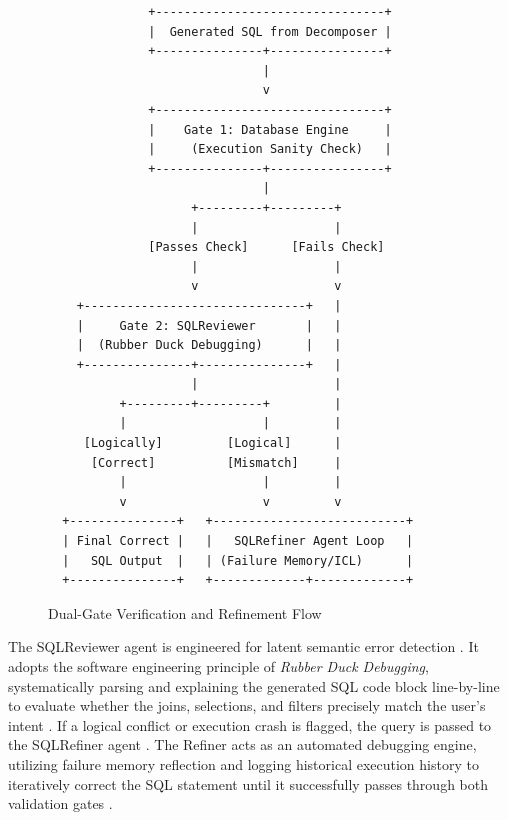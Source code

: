\begin{figure}[ht]
\centering
\begin{verbatim}
              +--------------------------------+
              |  Generated SQL from Decomposer |
              +---------------+----------------+
                              |
                              v
              +--------------------------------+
              |    Gate 1: Database Engine     |
              |     (Execution Sanity Check)   |
              +---------------+----------------+
                              |
                    +---------+---------+
                    |                   |
              [Passes Check]      [Fails Check]
                    |                   |
                    v                   v
    +-------------------------------+   |
    |     Gate 2: SQLReviewer       |   |
    |  (Rubber Duck Debugging)      |   |
    +---------------+---------------+   |
                    |                   |
          +---------+---------+         |
          |                   |         |
     [Logically]         [Logical]      |
      [Correct]          [Mismatch]     |
          |                   |         |
          v                   v         v
  +---------------+   +---------------------------+
  | Final Correct |   |   SQLRefiner Agent Loop   |
  |   SQL Output  |   | (Failure Memory/ICL)      |
  +---------------+   +-------------+-------------+
\end{verbatim}
\caption{Dual-Gate Verification and Refinement Flow}
\end{figure}

The SQLReviewer agent is engineered for latent semantic error detection \cite{SQLFixAgent_Towards_Semantic_Accurate_Text_to_SQL}. It adopts the
software engineering principle of \textit{Rubber Duck Debugging}, systematically parsing and explaining the generated
SQL code block line-by-line to evaluate whether the joins, selections, and filters precisely match the user's intent
\cite{SQLFixAgent_Towards_Semantic_Accurate_Text_to_SQL}. If a logical conflict or execution crash is flagged, the query is passed to the SQLRefiner
agent \cite{SQLFixAgent_Towards_Semantic_Accurate_Text_to_SQL}. The Refiner acts as an automated debugging engine, utilizing failure memory
reflection and logging historical execution history to iteratively correct the SQL statement until it successfully
passes through both validation gates \cite{SQLFixAgent_Towards_Semantic_Accurate_Text_to_SQL, Text_to_SQL_in_the_Era_of_LLMs}.

